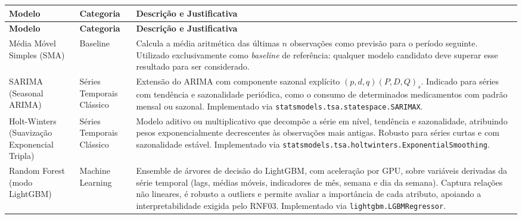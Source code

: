 \documentclass[12pt,a4paper]{article}
\begin{document}
\begin{longtable}{p{} p{} p{}}
    \toprule
    \textbf{Modelo}                                       & \textbf{Categoria} & \textbf{Descrição e Justificativa} \\
    \midrule
    \endfirsthead
    \toprule
    \textbf{Modelo}                                       & \textbf{Categoria} & \textbf{Descrição e Justificativa} \\
    \midrule
    \endhead

    Média Móvel Simples (SMA)                             &
    Baseline                                              &
    Calcula a média aritmética das últimas $n$ observações como previsão para
    o período seguinte. Utilizado exclusivamente como \textit{baseline} de
    referência: qualquer modelo candidato deve superar esse resultado para ser
    considerado.                                                                                                    \\
    \midrule

    SARIMA \newline (Seasonal ARIMA)                      &
    Séries Temporais Clássico                             &
    Extensão do ARIMA com componente sazonal explícito $(p,d,q)(P,D,Q)_s$.
    Indicado para séries com tendência e sazonalidade periódica, como o consumo
    de determinados medicamentos com padrão mensal ou sazonal.
    Implementado via \texttt{statsmodels.tsa.statespace.SARIMAX}.                                                   \\
    \midrule

    Holt-Winters \newline (Suavização Exponencial Tripla) &
    Séries Temporais Clássico                             &
    Modelo aditivo ou multiplicativo que decompõe a série em nível, tendência
    e sazonalidade, atribuindo pesos exponencialmente decrescentes às
    observações mais antigas. Robusto para séries curtas e com sazonalidade
    estável. Implementado via \texttt{statsmodels.tsa.holtwinters.ExponentialSmoothing}.                            \\
    \midrule

    Random Forest \newline (modo LightGBM)                &
    Machine Learning                                      &
    Ensemble de árvores de decisão do LightGBM, com aceleração por GPU,
    sobre variáveis derivadas da série temporal (lags, médias móveis,
    indicadores de mês, semana e dia da semana). Captura relações não
    lineares, é robusto a outliers e permite avaliar a importância de
    cada atributo, apoiando a interpretabilidade exigida pelo RNF03.
    Implementado via \texttt{lightgbm.LGBMRegressor}.                                                               \\
    \midrule


\end{longtable}
\end{document}
